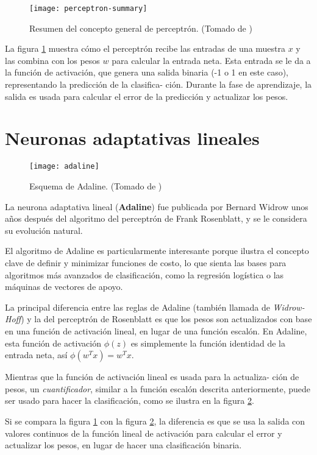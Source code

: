 \begin{figure}[H]
  \texttt{[image: perceptron-summary]} \centering
  \caption{Resumen del concepto general de perceptrón. (Tomado de
    \cite{python})}
  \label{fig:perceptron}
\end{figure}

La figura \ref{fig:perceptron} muestra cómo el perceptrón recibe las
entradas de una muestra $x$ y las combina con los pesos $w$ para
calcular la entrada neta.  Esta entrada se le da a la función de
activación, que genera una salida binaria (-1 o 1 en este caso),
representando la predicción de la clasifica- ción. Durante la fase de
aprendizaje, la salida es usada para calcular el error de la
predicción y actualizar los pesos.

\section{Neuronas adaptativas lineales}

\begin{figure}[H]
  \texttt{[image: adaline]} \centering
  \caption{Esquema de Adaline. (Tomado de \cite{python})}
  \label{fig:adaline}
\end{figure}

La neurona adaptativa lineal (\textbf{Adaline}) fue publicada por
Bernard Widrow \cite{adaline} unos años después del algoritmo del
perceptrón de Frank Rosenblatt, y se le considera su evolución natural.

El algoritmo de Adaline es particularmente interesante porque ilustra
el concepto clave de definir y minimizar funciones de costo, lo que
sienta las bases para algoritmos más avanzados de clasificación, como
la regresión logística o las máquinas de vectores de apoyo.

La principal diferencia entre las reglas de Adaline (también llamada
de \textit{Widrow-Hoff}) y la del perceptrón de Rosenblatt es que los
pesos son actualizados con base en una función de activación lineal,
en lugar de una función escalón. En Adaline, esta función de
activación $\phi (z)$ es simplemente la función identidad de la
entrada neta, así $\phi (w^T x) = w^T x$.

Mientras que la función de activación lineal es usada para la
actualiza- ción de pesos, un \textit{cuantificador}, similar a la
función escalón descrita anteriormente, puede ser usado para hacer la
clasificación, como se ilustra en la figura \ref{fig:adaline}.

Si se compara la figura \ref{fig:perceptron} con la figura
\ref{fig:adaline}, la diferencia es que se usa la salida con valores
continuos de la función lineal de activación para calcular el error y
actualizar los pesos, en lugar de hacer una clasificación binaria.

